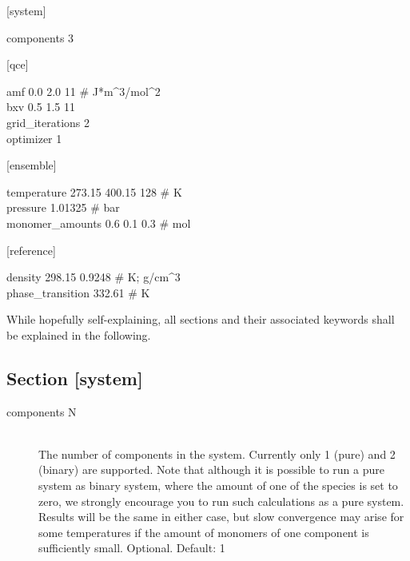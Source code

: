 \documentclass{scrartcl}
\begin{document}
\begin{addmargin}[1cm]{0cm}
    \ttfamily
    \begin{minipage}{\textwidth}
        [system]
        \begin{addmargin}[1cm]{0cm}
            components 3
        \end{addmargin}
    \end{minipage}

    \begin{minipage}{\textwidth}
        [qce]
        \begin{addmargin}[1cm]{0cm}
            amf 0.0 2.0 11 \# J*m\^{}3/mol\^{}2 \\
            bxv 0.5 1.5 11 \\
            grid\_iterations 2 \\
            optimizer 1
        \end{addmargin}
    \end{minipage}

    \begin{minipage}{\textwidth}
        [ensemble]
        \begin{addmargin}[1cm]{0cm}
            temperature 273.15 400.15 128 \# K \\
            pressure 1.01325 \# bar \\
            monomer\_amounts 0.6 0.1 0.3 \# mol
        \end{addmargin}
    \end{minipage}

    \begin{minipage}{\textwidth}
        [reference]
        \begin{addmargin}[1cm]{0cm}
            density 298.15 0.9248 \# K; g/cm\^{}3 \\
            phase\_transition 332.61 \# K
        \end{addmargin}
    \end{minipage}
\end{addmargin}

While hopefully self-explaining, all sections and their associated keywords shall be explained in the following.

\subsection{Section [system]}

\begin{description}
    \item[components N] \hfill \\
        The number of components in the system.
        Currently only 1 (pure) and 2 (binary) are supported.
        Note that although it is possible to run a pure system as binary system, where the amount of one of the species is set to zero, we strongly encourage you to run such calculations as a pure system.
        Results will be the same in either case, but slow convergence may arise for some temperatures if the amount of monomers of one component is sufficiently small.
        Optional. Default: 1
\end{description}
\end{document}
